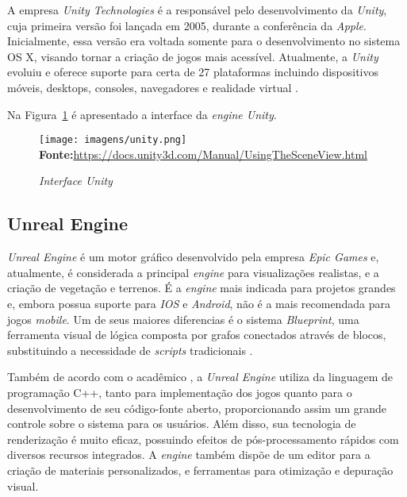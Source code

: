 A empresa \textit{Unity Technologies } é a responsável pelo desenvolvimento da \textit{Unity}, cuja primeira versão foi lançada em 2005, durante a conferência da \textit{Apple}. Inicialmente, essa versão era voltada somente para o desenvolvimento no sistema OS X, visando tornar a criação de jogos mais acessível. Atualmente, a \textit{Unity} evoluiu e oferece suporte para certa de 27 plataformas  incluindo dispositivos móveis, desktops, consoles, navegadores e realidade virtual \cite{Smid2017}.

Na Figura~\ref{fig:unity} é apresentado a interface da \textit{engine Unity}.

\FloatBarrier 
\begin{figure}[!htbp]
	\centering
	\caption{\textit{Interface Unity}}
	\texttt{[image: imagens/unity.png]}
	\\\textbf{Fonte:}\url{https://docs.unity3d.com/Manual/UsingTheSceneView.html } 
	\label{fig:unity}
\end{figure}
\FloatBarrier



\subsection{Unreal Engine}

\textit{Unreal Engine} é um motor gráfico desenvolvido pela empresa \textit{Epic Games} e, atualmente, é considerada a principal \textit{engine} para visualizações realistas, e a criação de vegetação e terrenos. É a \textit{engine} mais indicada para projetos grandes e, embora possua suporte para \textit{IOS} e \textit{Android}, não é a mais recomendada para jogos \textit{mobile}. Um de seus maiores diferencias é o sistema \textit{Blueprint}, uma ferramenta visual de lógica composta por grafos conectados através de blocos, substituindo a necessidade de \textit{scripts} tradicionais \cite{Smid2017}.

Também de acordo com o acadêmico , a \textit{Unreal Engine} utiliza da linguagem de programação C++, tanto para implementação dos jogos quanto para o desenvolvimento de seu código-fonte aberto, proporcionando assim um grande controle sobre o sistema para os usuários. Além disso, sua tecnologia de renderização é muito eficaz, possuindo efeitos de pós-processamento rápidos com diversos recursos integrados. A \textit{engine} também dispõe de um editor para a criação de  materiais personalizados, e ferramentas para otimização e depuração visual.

